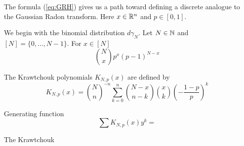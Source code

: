 The formula (\ref{eq:GRH}) gives us a path toward defining a discrete analogue to the Gaussian Radon transform. Here $x \in \mathbb{R}^n$ and $p \in [0,1]$.

We begin with the binomial distribution $d\gamma_N$. Let $N \in \mathbb{N}$ and $[N] = \{0, \ldots, N - 1\}$. For $x \in [N]$
\[
  \binom{N}{x}p^x(p-1)^{N-x}
\]

\begin{definition}
  The Krawtchouk polynomials $K_{N,p}(x)$ are defined by 
  \[
    K_{N,p}(x) = \binom{N}{n}^{-n} \sum_{k=0}^n \binom{N - x}{n - k}\binom{x}{k}\left(-\frac{1-p}{p}\right)^k
  \]
\end{definition}

Generating function
\[
  \sum K_{N,p}(x) y^k = 
\]

The Krawtchouk 


